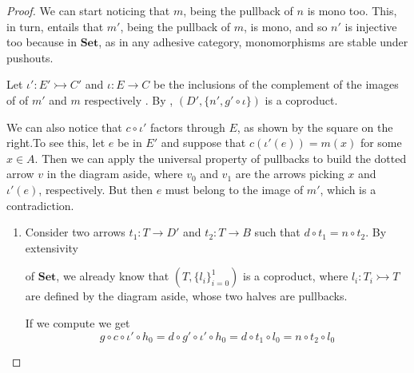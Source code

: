 \documentclass[3p]{elsarticle}
\newcommand{\Set}{\mathbf{Set}}
\newcommand{\mto}{\rightarrowtail}
\theoremstyle{remark}
\theoremstyle{definition}
\begin{document}
\begin{proof}\label{proof:kerset}
	We can start noticing that $m$, being the pullback of $n$ is mono too. This, in turn, entails that $m'$, being the pullback of $m$, is mono, and so $n'$ is injective too because in $\Set$, as in any adhesive category, monomorphisms are stable under pushouts.  
\vspace{.1cm}
	
	\noindent 
	\parbox{11.5cm}{\hspace{15pt}
	Let $\iota' \colon E'\mto C'$ and $\iota\colon E\to C$ be the inclusions of the complement of the images of of $m'$ and $m$ respectively . By , $(D', \{n', g'\circ \iota\})$ is a coproduct. }\hfill \parbox{4cm}{\vspace{-5pt}}
	
\vspace{.1cm}

	\noindent
	\parbox{10.5cm}{\hspace{15pt}We can also notice that $c\circ \iota'$ factors through $E$, as shown by the square on the right.To see this, let $e$ be in $E'$ and suppose that  $c(\iota'(e))=m(x)$ for some $x\in A$. Then we can apply the  universal property of pullbacks to build the dotted arrow $v$ in the diagram aside, where $v_0$ and $v_1$ are the arrows picking $x$ and $\iota'(e)$, respectively. But then $e$ must belong to the image of $m'$, which is a contradiction.}\hfill  \parbox{4cm}{}
	
	
	\begin{enumerate}
		\item Consider two arrows $t_1\colon T\to D' $ and $t_2\colon T\to B$ such that $d\circ t_1=n\circ t_2$. By extensivity
		
		\noindent\parbox{9.5cm}{ of $\Set$, we already know that $(T, \{l_i\}_{i=0}^1)$ is a coproduct, where $l_i\colon T_i\mto T$ are defined by the diagram aside, whose two halves are pullbacks. }\hfill\parbox{4cm}{}
		
		If we compute we get
		\[g\circ c \circ \iota' \circ h_0=d\circ g'\circ \iota' \circ h_0=d\circ t_1\circ l_0=n\circ t_2\circ l_0\]
		

\end{enumerate}
\end{proof}
\end{document}
